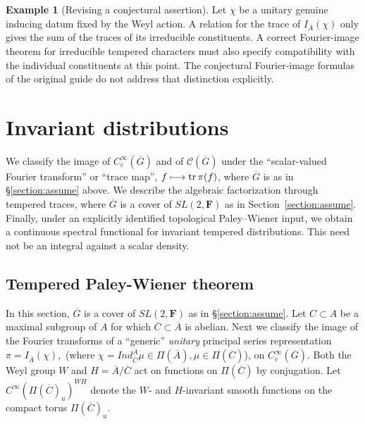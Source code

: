 \documentclass[12pt,letterpaper]{article}
\theoremstyle{definition}
\newtheorem{example}[theorem]{Example}
\theoremstyle{remark}
\newcommand{\F}{\mathbf{F}}
\newcommand{\bA}{\overline{A}}
\newcommand{\calC}{\mathcal C}
\begin{document}
\begin{example}[Revising a conjectural assertion]\label{ex:conjecture-status}
Let $\chi$ be a unitary genuine inducing datum fixed by the Weyl
action.  A relation for the trace of $I_{\bA}(\chi)$ only gives
the sum of the traces of its irreducible constituents.  A correct
Fourier-image theorem for irreducible tempered characters must also
specify compatibility with the individual constituents at this point.
The conjectural Fourier-image formulas of the original guide do not
address that distinction explicitly.
\end{example}


\section{Invariant distributions}
\label{sec:invariant}

We classify the image of $C_c^\infty(\overline{G})$
and of ${\calC}(\overline{G})$ under the ``scalar-valued
Fourier transform'' or ``trace map'',
$f\longmapsto {\rm tr}\, \pi(f)$, where $\overline{G}$ is as
in \S \ref{section:assume} above. 
We describe the algebraic factorization through tempered traces, where $\overline{G}$ is a cover of $SL(2,{\F})$ as in Section~\ref{section:assume}.
Finally, under an explicitly identified topological Paley--Wiener input,
we obtain a continuous spectral functional for invariant tempered
distributions.  This need not be an integral against a scalar density.

\subsection{Tempered Paley-Wiener theorem}
\label{subsec:TPW}

In this section, $\overline{G}$ is a cover of $SL(2,{\F})$ as in \S \ref{section:assume}.
Let $C\subset A$ be a maximal subgroup of $A$ for which 
$\overline{C}\subset \overline{A}$ is abelian.
Next we classify the image
of the Fourier transforms of a ``generic'' {\em unitary} principal series
representation 
$
\pi =I_{\overline{A }}(\chi ),
$
(where $\chi =Ind_{\overline{C}}^{\overline{A }}\mu \in \Pi (\overline{A }),
\mu \in \Pi (\overline{C })$),
on $C_c^\infty (\overline{G })$.
Both the Weyl group $W$ and
$H=\overline{A}/\overline{C}$ act on functions on $\Pi(\overline{C})$ by conjugation.
Let $C^\infty (\Pi(\overline{C})_u)^{WH}$ denote the 
$W$- and $H$-invariant smooth functions on the compact torus $\Pi(\overline{C})_u$.
\end{document}
